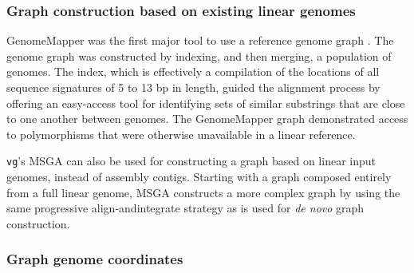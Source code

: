 \subsubsection{Graph construction based on existing linear genomes}

GenomeMapper was the first major tool to use a reference genome graph \cite{Schneeberger_2009}.
The genome graph was constructed by indexing, and then merging, a population of genomes. 
The index, which is effectively a compilation of the locations of all sequence signatures of 5 to 13 bp in length, guided the alignment process by offering an easy-access tool for identifying sets of similar substrings that are close to one another between genomes. 
The GenomeMapper graph demonstrated access to polymorphisms that were otherwise unavailable in a linear reference.

\texttt{vg}'s MSGA can also be used for constructing a graph based on linear input genomes, instead of assembly contigs.
Starting with a graph composed entirely from a full linear genome, MSGA constructs a more complex graph by using the same progressive align-andintegrate strategy as is used for \textit{de novo} graph construction. 

\subsubsection{Graph genome coordinates}


